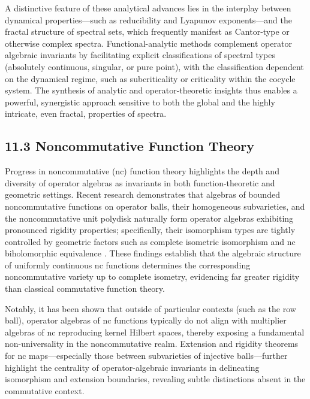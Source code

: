 \documentclass[11pt]{article}
\begin{document}
A distinctive feature of these analytical advances lies in the interplay between dynamical properties—such as reducibility and Lyapunov exponents—and the fractal structure of spectral sets, which frequently manifest as Cantor-type or otherwise complex spectra. Functional-analytic methods complement operator algebraic invariants by facilitating explicit classifications of spectral types (absolutely continuous, singular, or pure point), with the classification dependent on the dynamical regime, such as subcriticality or criticality within the cocycle system. The synthesis of analytic and operator-theoretic insights thus enables a powerful, synergistic approach sensitive to both the global and the highly intricate, even fractal, properties of spectra.

\subsection{11.3 Noncommutative Function Theory}

Progress in noncommutative (nc) function theory highlights the depth and diversity of operator algebras as invariants in both function-theoretic and geometric settings. Recent research demonstrates that algebras of bounded noncommutative functions on operator balls, their homogeneous subvarieties, and the noncommutative unit polydisk naturally form operator algebras exhibiting pronounced rigidity properties; specifically, their isomorphism types are tightly controlled by geometric factors such as complete isometric isomorphism and nc biholomorphic equivalence \cite{ref98}. These findings establish that the algebraic structure of uniformly continuous nc functions determines the corresponding noncommutative variety up to complete isometry, evidencing far greater rigidity than classical commutative function theory.

Notably, it has been shown that outside of particular contexts (such as the row ball), operator algebras of nc functions typically do not align with multiplier algebras of nc reproducing kernel Hilbert spaces, thereby exposing a fundamental non-universality in the noncommutative realm. Extension and rigidity theorems for nc maps—especially those between subvarieties of injective balls—further highlight the centrality of operator-algebraic invariants in delineating isomorphism and extension boundaries, revealing subtle distinctions absent in the commutative context.
\end{document}
